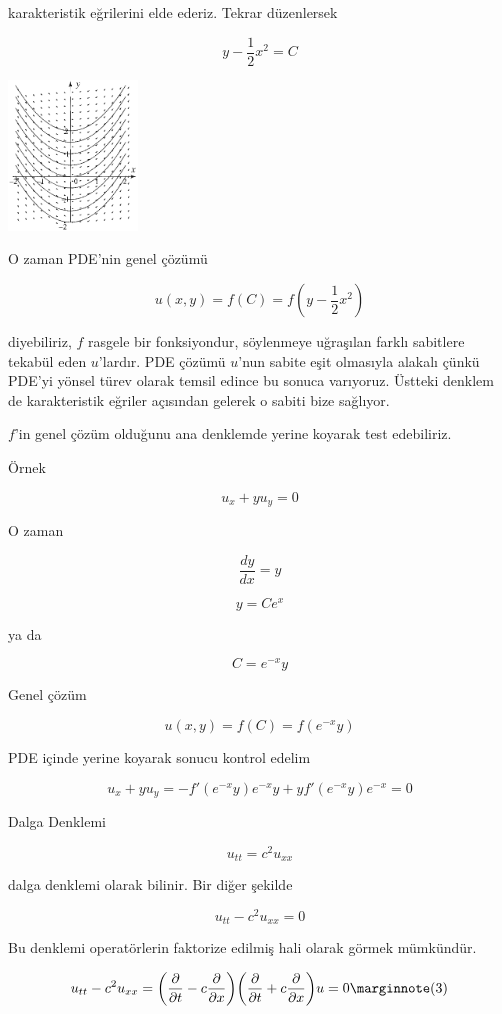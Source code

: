 \documentclass[12pt,fleqn]{article}\usepackage{../../common}
\begin{document}
karakteristik eğrilerini elde ederiz. Tekrar düzenlersek

$$ y - \frac{1}{2}x^2 = C $$

\includegraphics[height=4cm]{2_1.png}

O zaman PDE'nin genel çözümü 

$$ u(x,y) = f(C) = f(y - \frac{1}{2}x^2) $$

diyebiliriz, $f$ rasgele bir fonksiyondur, söylenmeye uğraşılan farklı
sabitlere tekabül eden $u$'lardır. PDE çözümü $u$'nun sabite eşit olmasıyla
alakalı çünkü PDE'yi yönsel türev olarak temsil edince bu sonuca
varıyoruz. Üstteki denklem de karakteristik eğriler açısından gelerek o
sabiti bize sağlıyor.

$f$'in genel çözüm olduğunu ana denklemde yerine koyarak test edebiliriz.

Örnek 

$$ u_x + yu_y = 0 $$

O zaman 

$$ \frac{dy}{dx} = y $$

$$ y = Ce^x $$

ya da

$$  C = e^{-x}y$$

Genel çözüm 

$$ u(x,y) = f(C) = f(e^{-x}y) $$

PDE içinde yerine koyarak sonucu kontrol edelim

$$ u_x + yu_y = 
-f'(e^{-x}y)e^{-x}y + y f'(e^{-x}y) e^{-x} = 0
 $$

Dalga Denklemi 

$$ u_{tt} = c^2 u_{xx} $$

dalga denklemi olarak bilinir. Bir diğer şekilde 

$$ u_{tt} - c^2 u_{xx} = 0$$

Bu denklemi operatörlerin faktorize edilmiş hali olarak görmek mümkündür. 

$$ u_{tt} - c^2 u_{xx} = 
\bigg( \frac{\partial }{\partial t} - c \frac{\partial }{\partial x} \bigg)
\bigg( \frac{\partial }{\partial t} + c \frac{\partial }{\partial x} \bigg)
u = 0
\mlabel{3}
$$
\end{document}
